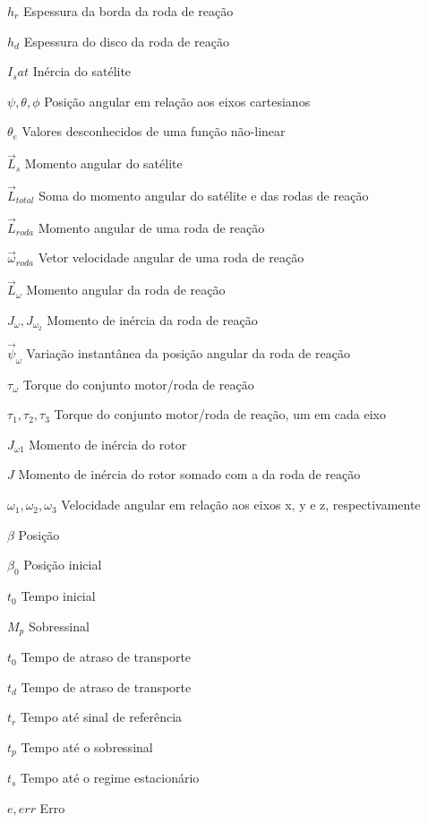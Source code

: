 \begin{simbolos}
  \item[$h_{r}$] Espessura da borda da roda de reação
  \item[$h_{d}$] Espessura do disco da roda de reação
  \item[$I_sat$] Inércia do satélite
  \item[$\psi, \theta, \phi$] Posição angular em relação aos eixos cartesianos
  \item[$\theta_e$] Valores desconhecidos de uma função não-linear
  \item[$\vec{L}_s$] Momento angular do satélite
  \item[$\vec{L}_{total}$] Soma do momento angular do satélite e das rodas de reação
  \item[$\vec{L}_{roda}$] Momento angular de uma roda de reação
  \item[$\vec{\omega}_{roda}$] Vetor velocidade angular de uma roda de reação
  \item[$\vec{L}_{\omega}$] Momento angular da roda de reação
  \item[$J_{\omega}, J_{\omega_2}$] Momento de inércia da roda de reação
  \item[$\vec{\psi}_{\omega}$] Variação instantânea da posição angular da roda de reação
  \item[$\tau_{\omega}$] Torque do conjunto motor/roda de reação
  \item[$\tau_{1}, \tau_{2}, \tau_{3}$] Torque do conjunto motor/roda de reação, um em cada eixo
  \item[$J_{\omega 1}$] Momento de inércia do rotor
  \item[$J$] Momento de inércia do rotor somado com a da roda de reação
  \item[$\omega_1, \omega_2, \omega_3$] Velocidade angular em relação aos eixos x, y e z, respectivamente
  \item[$\beta$] Posição
  \item[$\beta_0$] Posição inicial
  \item[$t_0$] Tempo inicial
  \item[$M_p$] Sobressinal
  \item[$t_0$] Tempo de atraso de transporte
  \item[$t_d$] Tempo de atraso de transporte
  \item[$t_r$] Tempo até sinal de referência
  \item[$t_p$] Tempo até o sobressinal
  \item[$t_s$] Tempo até o regime estacionário
  \item[$e,err$] Erro

\end{simbolos}
